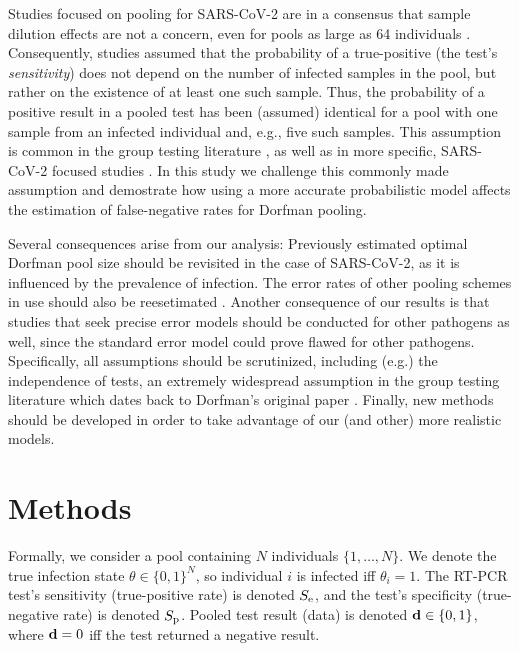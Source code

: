 \documentclass{article}
\begin{document}
Studies focused on pooling for SARS-CoV-2 are in a consensus that
sample dilution effects \cite{DilutionHIV, GroupDilution} are not a
concern, even for pools as large as 64 individuals \cite{PoolSize30,
  Lion, DorfmanYuvalDor, DilutionCOVID, CherifReview}. Consequently,
studies assumed that the probability of a true-positive (the test's
\emph{sensitivity}) does not depend on the number of infected samples
in the pool, but rather on the existence of at least one such
sample. Thus, the probability of a positive result in a pooled test
has been (assumed) identical for a pool with one sample from an
infected individual and, e.g., five such samples. This assumption is
common in the group testing literature \cite{Kim, OptimalDorfmanPool,
  CherifReview}, as well as in more specific, SARS-CoV-2 focused studies
\cite{Simplistic1, Simplistic2}. In this study we challenge this
commonly made assumption and demostrate how using a more accurate
probabilistic model affects the estimation of false-negative rates for
Dorfman pooling.

Several consequences arise from our analysis: Previously estimated optimal Dorfman
pool size \cite{OptimalDorfmanPool} should be revisited in the case of SARS-CoV-2, as it is influenced by the prevalence of infection. The error
rates of other pooling schemes in use should also be reesetimated
\cite{BayesianDorfman, Kim}. Another consequence of our results is that studies that seek precise error models should be conducted for other pathogens as well, since the standard error model could prove flawed for other pathogens. Specifically, all assumptions should be scrutinized, including (e.g.) the independence of tests, an  extremely widespread assumption in the group testing literature \cite{Kim, OptimalDorfmanPool} which dates back to Dorfman's original paper \cite{DorfmanOriginal}. Finally, new methods should be developed in order to take advantage of our (and other) more realistic models.

\section*{Methods}
Formally, we consider a pool containing $N$ individuals
$\{1,\dots,N\}$. We denote the true infection state $\theta \in
\{0,1\}^N$, so individual $i$ is infected iff $\theta_i=1$. The RT-PCR
test's sensitivity (true-positive rate) is denoted $S_{\text{e}}$, and the
test's specificity (true-negative rate) is denoted $S_{\text{p}}$. Pooled
test result (data) is denoted $\mathbf{d} \in \{0,1\}$, where $\mathbf{d}=0$ iff
the test returned a negative result.
\end{document}
